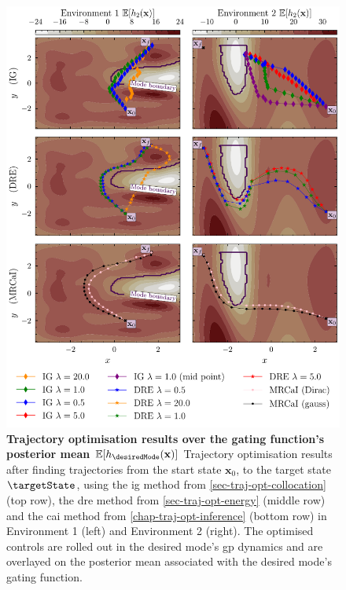 \documentclass{mimosis-class/mimosis}
\numberwithin{equation}{chapter}
\newcommand{\state}{\ensuremath{\mathbf{x}}}
\begin{document}
{\begin{figure}
\centering
\includegraphics[width=\textwidth]{./images/mode-opt/trajectory_optimisation/all_trajectories_over_gating_mean_both_scenarios.pdf}
\caption[Trajectory optimisation results over the gating function's posterior mean]{\textbf{Trajectory optimisation results over the gating function's posterior mean $\mathbb{E}[h_{\desiredMode}(\state)]$}
Trajectory optimisation results after finding trajectories from the start state $\state_0$,
to the target state $\targetState$, using the \acrfull{ig} method
from \cref{sec-traj-opt-collocation}
(top row), the \acrfull{dre} method from \cref{sec-traj-opt-energy} (middle row) and the
\acrfull{cai} method from \cref{chap-traj-opt-inference} (bottom row) in Environment 1 (left)
and Environment 2 (right).
The optimised controls are rolled out in the desired mode's \acrshort{gp} dynamics and are overlayed on the
posterior mean associated with the desired mode's gating function.}
\label{fig-all-traj-opt-mean}
\end{figure}

}
\end{document}

